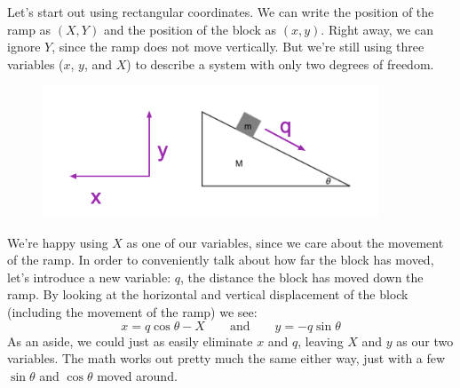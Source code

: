 \documentclass[12pt]{article}
\newcommand{\purple}[1]{{\color{purple} #1}}
\begin{document}
\purple{
Let's start out using rectangular coordinates. We can write the position of the ramp as $(X, Y)$ and the position of the block as $(x, y)$. Right away, we can ignore $Y$, since the ramp does not move vertically. But we're still using three variables ($x$, $y$, and $X$) to describe a system with only two degrees of freedom. 
\begin{figure}[h]
\includegraphics[width=10cm]{ramp-coords.png}
\centering
\end{figure}

We're happy using $X$ as one of our variables, since we care about the movement of the ramp. In order to conveniently talk about how far the block has moved, let's introduce a new variable: $q$, the distance the block has moved down the ramp. By looking at the horizontal and vertical displacement of the block (including the movement of the ramp) we see:
$$
x = q\cos\theta - X
\quad\quad \text{and} \quad\quad
y = -q\sin\theta
$$
As an aside, we could just as easily eliminate $x$ and $q$, leaving $X$ and $y$ as our two variables. The math works out pretty much the same either way, just with a few $\sin\theta$ and $\cos\theta$ moved around. 

}
\end{document}
